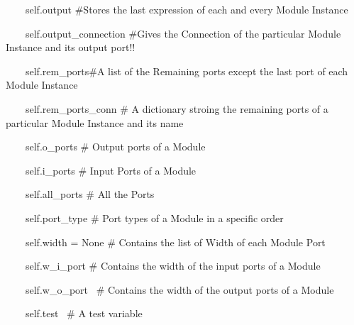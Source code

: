 \documentclass[a4paper]{article}
\begin{document}
\begin{center}
\begin{minipage}{6.63542in}
{\ttfamily\color[rgb]{0.0,0.0,0.039215688}
\ \ \ \ self.output \#Stores the last expression of each and every
Module Instance}

{\ttfamily\color[rgb]{0.0,0.0,0.039215688}
\ \ \ \ self.output\_connection \#Gives the Connection of the particular
Module Instance and its output port!!\ }

{\ttfamily\color[rgb]{0.0,0.0,0.039215688}
\ \ \ \ self.rem\_ports\#A list of the Remaining ports except the last
port of each Module Instance}

{\ttfamily\color[rgb]{0.0,0.0,0.039215688}
\ \ \ \ self.rem\_ports\_conn \# A dictionary stroing the remaining
ports of a particular Module Instance and its name\ }

{\ttfamily\color[rgb]{0.0,0.0,0.039215688}
\ \ \ \ self.o\_ports \# Output ports of a Module}

{\ttfamily\color[rgb]{0.0,0.0,0.039215688}
\ \ \ \ self.i\_ports \# Input Ports of a Module\ }

{\ttfamily\color[rgb]{0.0,0.0,0.039215688}
\ \ \ \ self.all\_ports \# All the Ports}

{\ttfamily\color[rgb]{0.0,0.0,0.039215688}
\ \ \ \ self.port\_type \# Port types of a Module in a specific order\ }

{\ttfamily\color[rgb]{0.0,0.0,0.039215688}
\ \ \ \ self.width = None \# Contains the list of Width of each Module
Port\ }

{\ttfamily\color[rgb]{0.0,0.0,0.039215688}
\ \ \ \ self.w\_i\_port \# Contains the width of the input ports of a
Module\ }

{\ttfamily\color[rgb]{0.0,0.0,0.039215688}
\ \ \ \ self.w\_o\_port \ \# Contains the width of the output ports of a
Module \ \ \ }

{\ttfamily\color[rgb]{0.0,0.0,0.039215688}
\ \ \ \ self.test \ \# A test variable}
\end{minipage}
\end{center}

\bigskip


\bigskip


\bigskip


\bigskip


\bigskip


\bigskip


\bigskip


\bigskip


\bigskip


\bigskip


\bigskip
\end{document}
